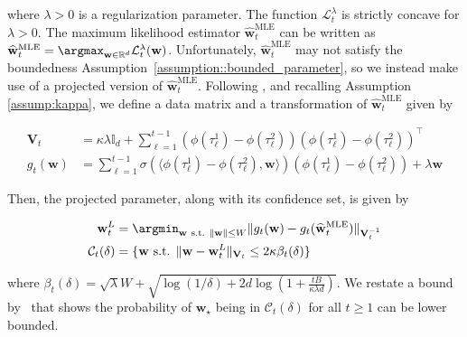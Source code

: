 where $\lambda > 0$ is a regularization parameter. The function $\mathcal{L}_t^\lambda$ is strictly concave for $\lambda> 0$. The maximum likelihood estimator $\widehat{{\mathbf w}}_t^{\mathrm{MLE}}$ can be written as $\widehat{{\mathbf w}}_t^{\mathrm{MLE}} = \argmax_{{\mathbf w} \in \mathbb{R}^{d}} \mathcal{L}_t^{\lambda}({\mathbf w})$. Unfortunately, $\widehat{{\mathbf w}}_t^{\mathrm{MLE}}$ may not satisfy the boundedness Assumption~\ref{assumption::bounded_parameter}, so we instead make use of a projected version of $\widehat{{\mathbf w}}_t^{\mathrm{MLE}}$. Following \cite{faury2020improved}, and recalling Assumption \ref{assump:kappa}, we define a data matrix and a transformation of $\widehat{{\mathbf w}}_t^{\mathrm{MLE}}$ given by

\begin{align*}
    {\mathbf{V}}_t  & = \kappa \lambda \mathbb{I}_d  + \sum_{\ell=1}^{t-1} \left( \phi(\tau_\ell^1) - \phi(\tau_\ell^2)  \right)\left( \phi(\tau_\ell^1) - \phi(\tau_\ell^2) \right)^\top \\
    g_t({\mathbf w}) & = \sum_{\ell=1}^{t-1} \sigma(\langle \phi(\tau_\ell^1) - \phi(\tau_\ell^2), {\mathbf w}\rangle ) \left( \phi(\tau_\ell^1) - \phi(\tau_\ell^2)\right) + \lambda  {\mathbf w}
\end{align*}

Then, the projected parameter, along with its confidence set, is given by

\begin{align}\label{eq::projection}
    {\mathbf w}_t^L & = \argmin_{{\mathbf w} ~\text{s.t.}~ \|{\mathbf w} \|\leq W} \| g_t({\mathbf w}) - g_t(\widehat{{\mathbf w}}_t^{\mathrm{MLE}} ) \|_{{\mathbf{V}}_t^{-1}} \\
    \label{eq::c_t}
    \mathcal{C}_t(\delta) & = \{ {\mathbf w} \text{ s.t. } \| {\mathbf w}  - {\mathbf w}^L_t\|_{{\mathbf{V}}_t} \leq 2\kappa \beta_t(\delta) \}
\end{align}

where $\beta_t(\delta) = \sqrt{\lambda} W + \sqrt{\log(1/\delta) + 2d\log\left(1 + \frac{tB}{\kappa \lambda d}\right)}$. We restate a bound by~\cite{faury2020improved} that shows the probability of ${\mathbf w}_\star$ being in $\mathcal{C}_t(\delta)$ for all $t\geq 1$ can be lower bounded.

